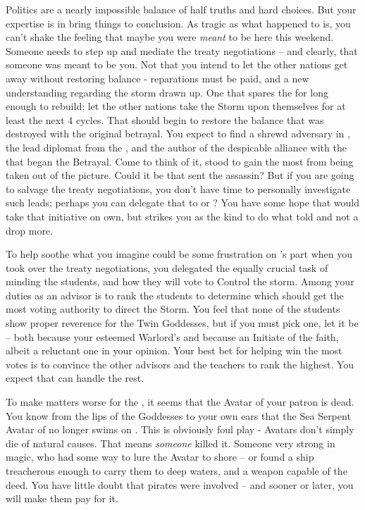 \documentclass[char]{GL2020}
\begin{document}
Politics are a nearly impossible balance of half truths and hard choices. But your expertise is in bring things to conclusion. As tragic as what happened to \cHeadDiplomat{} is, you can't shake the feeling that maybe you were \emph{meant} to be here this weekend. Someone needs to step up and mediate the treaty negotiations -- and clearly, that someone was meant to be you. Not that you intend to let the other nations get away without restoring balance - reparations must be paid, and a new understanding regarding the storm drawn up. One that spares the \pShip{} for long enough to rebuild; let the other nations take the Storm upon themselves for at least the next 4 cycles. That should begin to restore the balance that was destroyed with the original betrayal. You expect to find a shrewd adversary in \cDiplomat{\full}, the lead diplomat from the \pTech{}, and the author of the despicable alliance with the \pFarm{} that began the Betrayal. Come to think of it, \cDiplomat{} stood to gain the most from \cHeadDiplomat{} being taken out of the picture. Could it be that \cDiplomat{\they} sent the assassin? But if you are going to salvage the treaty negotiations, you don't have time to personally investigate such leads; perhaps you can delegate that to \cJuniorStatesman{} or \cChupLeader{}? You have some hope that \cJuniorStatesman{} would take that initiative on \cJuniorStatesman{\their} own, but \cChupLeader{} strikes you as the kind to do what \cChupLeader{\theyare} told and not a drop more.

To help soothe what you imagine could be some frustration on \cJuniorStatesman{}'s part when you took over the treaty negotiations, you delegated \cJuniorStatesman{\them} the equally crucial task of minding the students, and how they will vote to Control the storm. Among your duties as an advisor is to rank the students to determine which should get the most voting authority to direct the Storm. You feel that none of the students show proper reverence for the Twin Goddesses, but if you must pick one, let it be \cWarlordDaughter{\full}– both because \cWarlordDaughter{\theyare} your esteemed Warlord's \cWarlordDaughter{\child} and because \cWarlordDaughter{\theyare} an Initiate of the faith, albeit a reluctant one in your opinion. Your best bet for helping \cWarlordDaughter{} win the most votes is to convince the other \pShip{} advisors and the \pFarm{} teachers to rank \cWarlordDaughter{\them} the highest. You expect that \cJuniorStatesman{} can handle the rest.

To make matters worse for the \pShip{}, it seems that the Avatar of your patron \cEbb{\God} is dead. You know from the lips of the Goddesses to your own ears that the Sea Serpent Avatar of \cEbb{} no longer swims on \pEarth{}. This is obviously foul play - Avatars don't simply die of natural causes. That means \emph{someone} killed it. Someone very strong in magic, who had some way to lure the Avatar to shore -- or found a ship treacherous enough to carry them to deep waters, and a weapon capable of the deed. You have little doubt that pirates were involved -- and sooner or later, you will make them pay for it.
\end{document}
